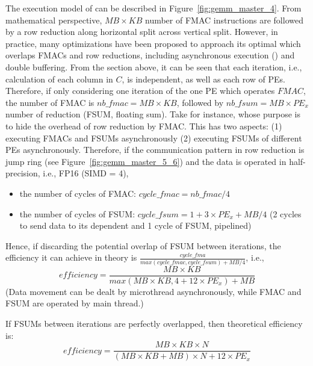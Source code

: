 The execution model of \master can be described in Figure~\ref{fig:gemm_master_4}.
%
From mathematical perspective, $MB \times KB$ number of FMAC instructions are followed by a row reduction along horizontal split across vertical split.
%
However, in practice, many optimizations have been proposed to approach its optimal which overlaps FMACs and row reductions, including asynchronous execution (\async) and double buffering.
%
From the section above, it can be seen that each iteration, i.e., calculation of each column in $C$, is independent, as well as each row of PEs.
%
Therefore, if only considering one iteration of the one PE which operates $FMAC$, the number of FMAC is $nb\_fmac = MB \times KB$, followed by $nb\_fsum = MB \times PE_x$ number of reduction (FSUM, floating sum).
%
Take \async for instance, whose purpose is to hide the overhead of row reduction by FMAC.
%
This \async has two aspects: (1) executing FMACs and FSUMs asynchronously (2) executing FSUMs of different PEs asynchronously.
%
Therefore, if the communication pattern in row reduction is jump ring (see Figure~\ref{fig:gemm_master_5_6}) and the data is operated in half-precision, i.e., FP16 (SIMD = 4),
\begin{itemize}
  \item the number of cycles of FMAC: $cycle\_fmac = nb\_fmac/4$
  \item the number of cycles of FSUM: $cycle\_fsum = 1 + 3 \times PE_x + MB/4$ (2 cycles to send data to its dependent and 1 cycle of FSUM, pipelined)
\end{itemize}
%
Hence, if discarding the potential overlap of FSUM between iterations, the efficiency it can achieve in theory is $\frac{cycle\_fma}{max(cycle\_fmac, cycle\_fsum) + MB/4}$, i.e., 
\begin{equation}
  efficiency = \frac{MB \times KB}{max(MB \times KB, 4 + 12 \times PE_x) + MB}
  \label{eq:master}
\end{equation}
%
(Data movement can be dealt by microthread asynchronously, while FMAC and FSUM are operated by main thread.)

If FSUMs between iterations are perfectly overlapped, then theoretical efficiency is:
\begin{equation}
  efficiency = \frac{MB \times KB \times N}{(MB \times KB + MB) \times N + 12 \times PE_x}
  \label{eq:master_2}
\end{equation}
%
%
%




